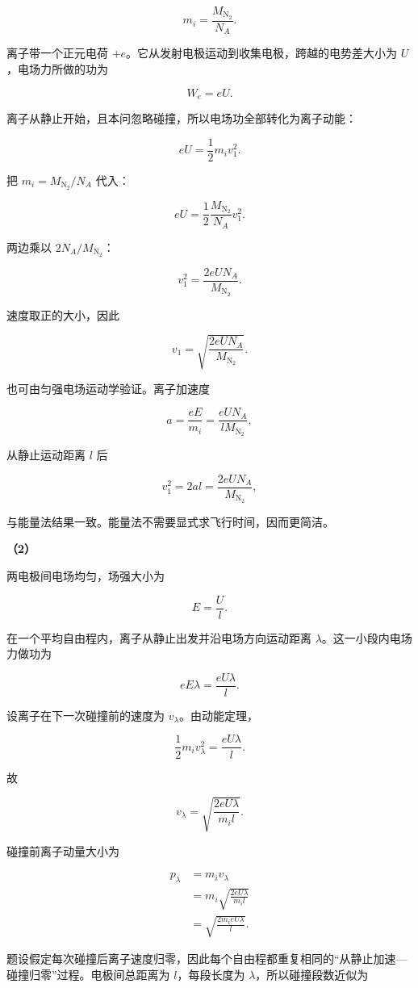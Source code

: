 \documentclass[12pt,a4paper,UTF8]{ctexart}
\begin{document}
\[m_i=\frac{M_{\mathrm{N_2}}}{N_A}.\]

离子带一个正元电荷
\(+e\)。它从发射电极运动到收集电极，跨越的电势差大小为
\(U\)，电场力所做的功为

\[W_e=eU.\]

离子从静止开始，且本问忽略碰撞，所以电场功全部转化为离子动能：

\[eU=\frac12m_iv_1^2.\]

把 \(m_i=M_{\mathrm{N_2}}/N_A\) 代入：

\[eU=\frac12\frac{M_{\mathrm{N_2}}}{N_A}v_1^2.\]

两边乘以 \(2N_A/M_{\mathrm{N_2}}\)：

\[v_1^2=\frac{2eUN_A}{M_{\mathrm{N_2}}}.\]

速度取正的大小，因此

\[\boxed{v_1=\sqrt{\frac{2eUN_A}{M_{\mathrm{N_2}}}}}.\]

也可由匀强电场运动学验证。离子加速度

\[a=\frac{eE}{m_i}=\frac{eUN_A}{lM_{\mathrm{N_2}}},\]

从静止运动距离 \(l\) 后

\[v_1^2=2al=\frac{2eUN_A}{M_{\mathrm{N_2}}},\]

与能量法结果一致。能量法不需要显式求飞行时间，因而更简洁。

\textbf{（2）}

两电极间电场均匀，场强大小为

\[E=\frac Ul.\]

在一个平均自由程内，离子从静止出发并沿电场方向运动距离
\(\lambda\)。这一小段内电场力做功为

\[eE\lambda=\frac{eU\lambda}{l}.\]

设离子在下一次碰撞前的速度为 \(v_\lambda\)。由动能定理，

\[\frac12m_iv_\lambda^2=\frac{eU\lambda}{l}.\]

故

\[v_\lambda=\sqrt{\frac{2eU\lambda}{m_il}}.\]

碰撞前离子动量大小为

\[\begin{aligned}
p_\lambda
&=m_iv_\lambda\\
&=m_i\sqrt{\frac{2eU\lambda}{m_il}}\\
&=\sqrt{\frac{2m_ieU\lambda}{l}}.
\end{aligned}\]

题设假定每次碰撞后离子速度归零，因此每个自由程都重复相同的``从静止加速---碰撞归零''过程。电极间总距离为
\(l\)，每段长度为 \(\lambda\)，所以碰撞段数近似为
\end{document}
